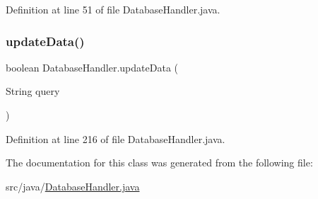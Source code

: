 Definition at line 51 of file Database\+Handler.\+java.

\mbox{\label{class_database_handler_a45a6be08d6806eaf3b2730ce40c353e8}} 
\subsubsection{\texorpdfstring{updateData()}{updateData()}}
{\footnotesize\ttfamily boolean Database\+Handler.\+update\+Data (\begin{DoxyParamCaption}\item[{String}]{query }\end{DoxyParamCaption})}



Definition at line 216 of file Database\+Handler.\+java.



The documentation for this class was generated from the following file\+:\begin{DoxyCompactItemize}
\item 
src/java/\mbox{\hyperlink{_database_handler_8java}{Database\+Handler.\+java}}\end{DoxyCompactItemize}
